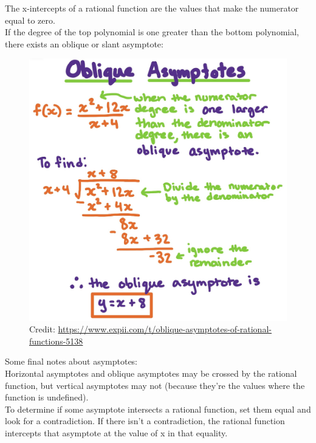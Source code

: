 \documentclass[12pt]{article}
\begin{document}
The x-intercepts of a rational function are the values that make the numerator equal to zero.\\

If the degree of the top polynomial is one greater than the bottom polynomial, there exists an oblique or slant asymptote:\\

\begin{figure}[H]
	\centering
	\includegraphics[scale=.2]{oblique.jpg}
	\caption{Credit: \url{https://www.expii.com/t/oblique-asymptotes-of-rational-functions-5138}}
\end{figure}

Some final notes about asymptotes:\\

Horizontal asymptotes and oblique asymptotes may be crossed by the rational function, but vertical asymptotes may not (because they're the values where the function is undefined).\\

To determine if some asymptote intersects a rational function, set them equal and look for a contradiction. If there isn't a contradiction, the rational function intercepts that asymptote at the value of x in that equality.\\
\end{document}
